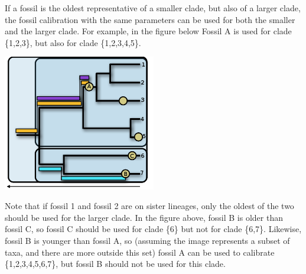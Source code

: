 \documentclass{article}
\begin{document}
If a fossil is the oldest representative of a smaller clade, but also of a
larger clade, the fossil calibration with the same parameters can be used for 
both the smaller and the larger clade.  For example, in the figure below
Fossil A is used for clade \{1,2,3\}, but also for clade \{1,2,3,4,5\}.
\begin{center}\includegraphics[width=0.5\textwidth,clip=true]{clades.png}\end{center}
Note that if fossil 1 and fossil 2 are on sister lineages, only the oldest of 
the two should be used for the larger clade. In the figure above, fossil B
is older than fossil C, so fossil C should be used for clade \{6\} but
not for clade \{6,7\}. Likewise, fossil B is younger than fossil A, so 
(assuming the image represents a subset of taxa, and there are more outside
this set) fossil A can be used to calibrate \{1,2,3,4,5,6,7\}, but
fossil B should not be used for this clade.
\end{document}
